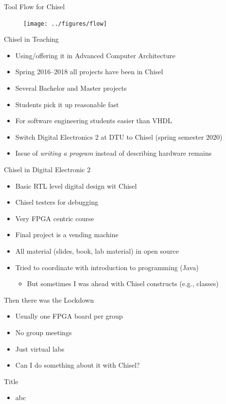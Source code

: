 \begin{frame}[fragile]{Tool Flow for Chisel}
\begin{figure}
    \centering
    \texttt{[image: ../figures/flow]}
\end{figure}
\end{frame}

\begin{frame}[fragile]{Chisel in Teaching}
\begin{itemize}
\item Using/offering it in Advanced Computer Architecture
\item Spring 2016--2018 all projects have been in Chisel
\item Several Bachelor and Master projects
\item Students pick it up reasonable fast
\item For software engineering students easier than VHDL
\item Switch Digital Electronics 2 at DTU to Chisel (spring semester 2020)
\item Issue of \emph{writing a program} instead of describing hardware remains
\end{itemize}
\end{frame}

\begin{frame}[fragile]{Chisel in Digital Electronic 2}
\begin{itemize}
\item Basic RTL level digital design wit Chisel
\item Chisel testers for debugging
\item Very FPGA centric course
\item Final project is a vending machine
\item All material (slides, book, lab material) in open source
\item Tried to coordinate with introduction to programming (Java)
\begin{itemize}
\item But sometimes I was ahead with Chisel constructs (e.g., classes)
\end{itemize}
\end{itemize}
\end{frame}

\begin{frame}[fragile]{Then there was the Lockdown}
\begin{itemize}
\item Usually one FPGA board per group
\item No group meetings
\item Just virtual labs
\item Can I do something about it with Chisel?
\end{itemize}
\end{frame}



\begin{frame}[fragile]{Title}
\begin{itemize}
\item abc
\end{itemize}
\end{frame}
